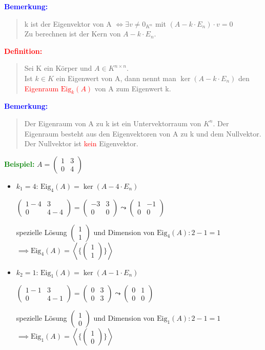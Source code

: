 \documentclass{article}
\newcommand{\red}[1]{\textcolor{red}{#1}}
\newcommand{\blue}[1]{\textcolor{blue}{#1}}
\newcommand{\green}[1]{\textcolor{green}{#1}}
\newcommand{\ex}{\green{\textbf{Beispiel: }}}
\newcommand{\de}[1]{\red{\textbf{Definition: }}\begin{quote}#1\end{quote}}
\newcommand{\an}[1]{\blue{\textbf{Bemerkung: }}\begin{quote}#1\end{quote}}
\newcommand{\vvec}[2]{\begin{pmatrix}#1\\#2\end{pmatrix}}
\newcommand{\spann}[1]{\left\langle#1\right\rangle}
\newcommand{\eig}{\text{Eig}}
\begin{document}
\an{
    k ist der Eigenvektor von A $\iff \exists v \ne 0_{K^n}$ mit $(A - k \cdot E_n) \cdot v = 0$\\
    Zu berechnen ist der Kern von $A - k \cdot E_n$.
}

\de{
    Sei K ein Körper und $A \in K^{n \times n}$.\\
    Ist $k \in K$ ein Eigenwert von A, dann nennt man $\ker(A - k \cdot E_n)$ den \red{Eigenraum $\eig_k(A)$} von A zum Eigenwert k.
}

\an{
    Der Eigenraum von A zu k ist ein Untervektorraum von $K^n$. Der Eigenraum besteht aus den Eigenvektoren von A zu k und dem Nullvektor. Der Nullvektor ist \red{kein} Eigenvektor.
}

\ex $A = \begin{pmatrix}
    1 & 3\\
    0 & 4
\end{pmatrix}$
\begin{itemize}
    \item $k_1 = 4$: $\eig_4(A) = \ker(A - 4 \cdot E_n)$
    
    $\begin{pmatrix}
        1 - 4 & 3\\
        0 & 4 - 4
    \end{pmatrix} = \begin{pmatrix}
        -3 & 3\\
        0 & 0
    \end{pmatrix} \leadsto \begin{pmatrix}
        1 & -1\\
        0 & 0
    \end{pmatrix}$

    spezielle Lösung $\vvec{1}{1}$ und Dimension von $\eig_4(A): 2-1 = 1$\\
    $\implies \eig_4(A) = \spann{\{\vvec{1}{1}\}}$
    \item $k_2 = 1$: $\eig_1(A) = \ker(A - 1 \cdot E_n)$
    
    $\begin{pmatrix}
        1 - 1 & 3\\
        0 & 4 - 1
    \end{pmatrix} = \begin{pmatrix}
        0 & 3\\
        0 & 3
    \end{pmatrix} \leadsto \begin{pmatrix}
        0 & 1\\
        0 & 0
    \end{pmatrix}$

    spezielle Lösung $\vvec{1}{0}$ und Dimension von $\eig_1(A): 2-1 = 1$\\
    $\implies \eig_1(A) = \spann{\{\vvec{1}{0}\}}$
\end{itemize}
\end{document}
